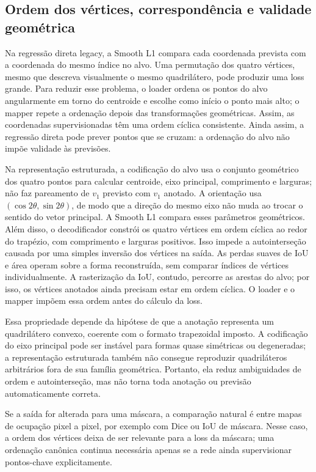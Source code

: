 \documentclass[11pt]{article}
\begin{document}
\subsection{Ordem dos vértices, correspondência e validade geométrica}

Na regressão direta legacy, a Smooth L1 compara cada coordenada prevista com a
coordenada do mesmo índice no alvo. Uma permutação dos quatro vértices, mesmo que
descreva visualmente o mesmo quadrilátero, pode produzir uma loss grande. Para
reduzir esse problema, o loader ordena os pontos do alvo angularmente em torno do
centroide e escolhe como início o ponto mais alto; o mapper repete a ordenação
depois das transformações geométricas. Assim, as coordenadas supervisionadas têm
uma ordem cíclica consistente. Ainda assim, a regressão direta pode prever pontos
que se cruzam: a ordenação do alvo não impõe validade às previsões.

Na representação estruturada, a codificação do alvo usa o conjunto geométrico dos
quatro pontos para calcular centroide, eixo principal, comprimento e larguras; não
faz pareamento de $v_1$ previsto com $v_1$ anotado. A orientação usa
$(\cos 2\theta,\sin 2\theta)$, de modo que a direção do mesmo eixo não muda ao
trocar o sentido do vetor principal. A Smooth L1 compara esses parâmetros
geométricos. Além disso, o decodificador constrói os quatro vértices em ordem
cíclica ao redor do trapézio, com comprimento e larguras positivos. Isso impede a
autointerseção causada por uma simples inversão dos vértices na saída. As perdas
suaves de IoU e área operam sobre a forma reconstruída, sem comparar índices de
vértices individualmente. A rasterização da IoU, contudo, percorre as arestas do
alvo; por isso, os vértices anotados ainda precisam estar em ordem cíclica. O
loader e o mapper impõem essa ordem antes do cálculo da loss.

Essa propriedade depende da hipótese de que a anotação representa um quadrilátero
convexo, coerente com o formato trapezoidal imposto. A codificação do eixo
principal pode ser instável para formas quase simétricas ou degeneradas; a
representação estruturada também não consegue reproduzir quadriláteros arbitrários
fora de sua família geométrica. Portanto, ela reduz ambiguidades de ordem e
autointerseção, mas não torna toda anotação ou previsão automaticamente correta.

Se a saída for alterada para uma máscara, a comparação natural é entre mapas de
ocupação pixel a pixel, por exemplo com Dice ou IoU de máscara. Nesse caso, a ordem
dos vértices deixa de ser relevante para a loss da máscara; uma ordenação canônica
continua necessária apenas se a rede ainda supervisionar pontos-chave explicitamente.
\end{document}
